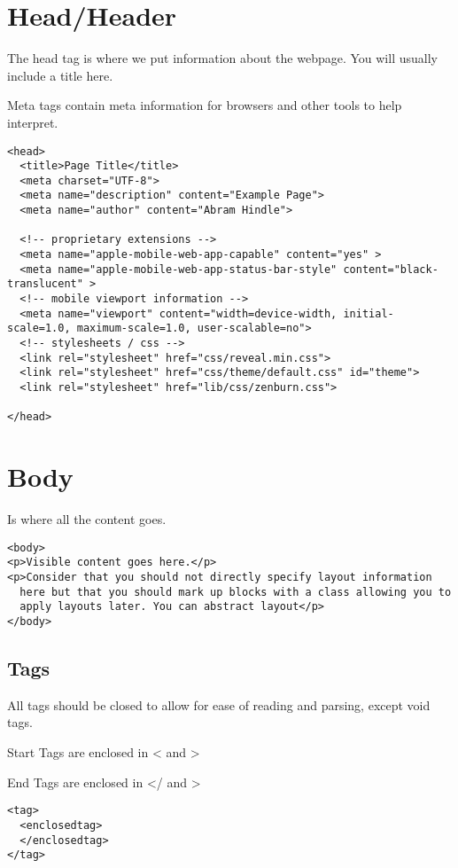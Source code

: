 \documentclass[../CMPUT-404-Notes.tex]{subfiles}
\begin{document}
\section{Head/Header}

The head tag is where we put information about the webpage. You will usually include a title here.

Meta tags contain meta information for browsers and other tools to help interpret.

\begin{verbatim}
<head>
  <title>Page Title</title>
  <meta charset="UTF-8">
  <meta name="description" content="Example Page">
  <meta name="author" content="Abram Hindle">
  
  <!-- proprietary extensions -->
  <meta name="apple-mobile-web-app-capable" content="yes" >
  <meta name="apple-mobile-web-app-status-bar-style" content="black-translucent" >
  <!-- mobile viewport information -->
  <meta name="viewport" content="width=device-width, initial-scale=1.0, maximum-scale=1.0, user-scalable=no">
  <!-- stylesheets / css -->
  <link rel="stylesheet" href="css/reveal.min.css">
  <link rel="stylesheet" href="css/theme/default.css" id="theme">
  <link rel="stylesheet" href="lib/css/zenburn.css">
  
</head>
\end{verbatim}


\section{Body}
Is where all the content goes.
\begin{verbatim}
<body>
<p>Visible content goes here.</p>
<p>Consider that you should not directly specify layout information
  here but that you should mark up blocks with a class allowing you to
  apply layouts later. You can abstract layout</p>
</body>  
\end{verbatim}

\subsection{Tags}
All tags should be closed to allow for ease of reading and parsing, except void tags.

Start Tags are enclosed in < and >

End Tags are enclosed in </ and >

\begin{verbatim}
<tag>
  <enclosedtag>
  </enclosedtag>
</tag>
\end{verbatim}
\end{document}
